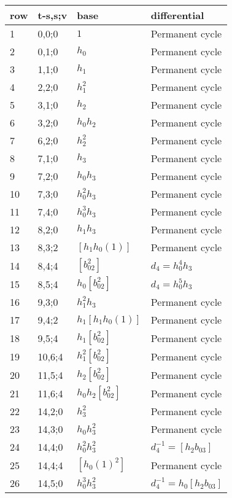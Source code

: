 \documentclass{article}
\begin{document}
\begin{longtable}{|l|l|>{\raggedright\arraybackslash}p{6cm}|>{\raggedright\arraybackslash}p{6cm}|}\hline
row & t-s,s;v & base & differential\\\hline
1 & 0,0;0 & $1$ & Permanent cycle\\
\hline
2 & 0,1;0 & $h_0$ & Permanent cycle\\
\hline
3 & 1,1;0 & $h_1$ & Permanent cycle\\
\hline
4 & 2,2;0 & $h_1^2$ & Permanent cycle\\
\hline
5 & 3,1;0 & $h_2$ & Permanent cycle\\
\hline
6 & 3,2;0 & $h_0h_2$ & Permanent cycle\\
\hline
7 & 6,2;0 & $h_2^2$ & Permanent cycle\\
\hline
8 & 7,1;0 & $h_3$ & Permanent cycle\\
\hline
9 & 7,2;0 & $h_0h_3$ & Permanent cycle\\
\hline
10 & 7,3;0 & $h_0^2h_3$ & Permanent cycle\\
\hline
11 & 7,4;0 & $h_0^3h_3$ & Permanent cycle\\
\hline
12 & 8,2;0 & $h_1h_3$ & Permanent cycle\\
\hline
13 & 8,3;2 & $[h_1h_0(1)]$ & Permanent cycle\\
\hline
14 & 8,4;4 & $[b_{02}^2]$ &$d_{4}=h_0^4h_3$\\
\hline
15 & 8,5;4 & $h_0[b_{02}^2]$ &$d_{4}=h_0^5h_3$\\
\hline
16 & 9,3;0 & $h_1^2h_3$ & Permanent cycle\\
\hline
17 & 9,4;2 & $h_1[h_1h_0(1)]$ & Permanent cycle\\
\hline
18 & 9,5;4 & $h_1[b_{02}^2]$ & Permanent cycle\\
\hline
19 & 10,6;4 & $h_1^2[b_{02}^2]$ & Permanent cycle\\
\hline
20 & 11,5;4 & $h_2[b_{02}^2]$ & Permanent cycle\\
\hline
21 & 11,6;4 & $h_0h_2[b_{02}^2]$ & Permanent cycle\\
\hline
22 & 14,2;0 & $h_3^2$ & Permanent cycle\\
\hline
23 & 14,3;0 & $h_0h_3^2$ & Permanent cycle\\
\hline
24 & 14,4;0 & $h_0^2h_3^2$ & $d_{4}^{-1}=[h_2b_{03}]$\\
\hline
25 & 14,4;4 & $[h_0(1)^2]$ & Permanent cycle\\
\hline
26 & 14,5;0 & $h_0^3h_3^2$ & $d_{4}^{-1}=h_0[h_2b_{03}]$\\

\end{longtable}
\end{document}

